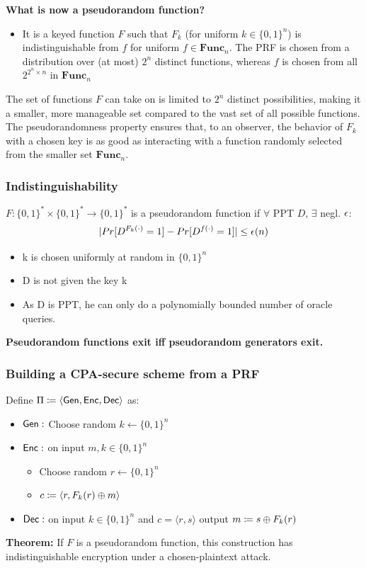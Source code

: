 \documentclass[12pt]{article}
\begin{document}
\textbf{What is now a pseudorandom function?}
\begin{itemize}
\item It is a keyed function $F$ such that $F_k$ (for uniform $k\in \{0,1\}^n$) is indistinguishable from $f$ for uniform  $f \in \textbf{Func}_n$. The PRF is chosen from a distribution over (at most) $2^n$ distinct functions, whereas $f$ is chosen from all $2^{2^n\times n}$ in $\textbf{Func}_n$
\end{itemize}
The set of functions \( F \) can take on is limited to \( 2^n \) distinct possibilities, making it a smaller, more manageable set compared to the vast set of all possible functions. The pseudorandomness property ensures that, to an observer, the behavior of \( F_k \) with a chosen key is as good as interacting with a function randomly selected from the smaller set \( \textbf{Func}_n \).
\subsubsection{Indistinguishability}
$F: \{0,1\}^* \times \{0,1\}^* \rightarrow \{0,1\}^*$ is a pseudorandom function if $\forall$ PPT $D$, $\exists$ negl. $\epsilon$:
\begin{equation*}
|Pr[D^{F_k(\cdot)}=1]-Pr[D^{f(\cdot)}=1]| \le \epsilon(n)
\end{equation*}
\begin{itemize}
\item k is chosen uniformly at random in $\{0,1\}^n$
\item D is not given the key k
\item As D is PPT, he can only do a polynomially bounded number of oracle queries.
\end{itemize}
\textbf{Pseudorandom functions exit iff pseudorandom generators exit.}

\subsubsection{Building a CPA-secure scheme from a PRF}
Define $\Pi \coloneqq \langle \operatorname{\mathsf{Gen}}, \operatorname{\mathsf{Enc}}, \operatorname{\mathsf{Dec}} \rangle$ as:\begin{itemize}
\item $\operatorname{\mathsf{Gen}}:$ Choose random $k\leftarrow \{0,1\}^n$
\item $\operatorname{\mathsf{Enc}}:$ on input $m,k \in  \{0,1\}^n$
	\begin{itemize}
	\item Choose random $r\leftarrow \{0,1\}^n$
	\item $c\coloneqq \langle r,F_k(r)\oplus m\rangle$
	\end{itemize}
\item $\operatorname{\mathsf{Dec}}:$ on input $k \in\{0,1\}^n$ and $c = \langle r,s \rangle$ output $m\coloneqq s\oplus F_k(r)$
\end{itemize}
\textbf{Theorem:} If $F$ is a pseudorandom function, this construction has indistinguishable encryption under a chosen-plaintext attack.\\
\end{document}
